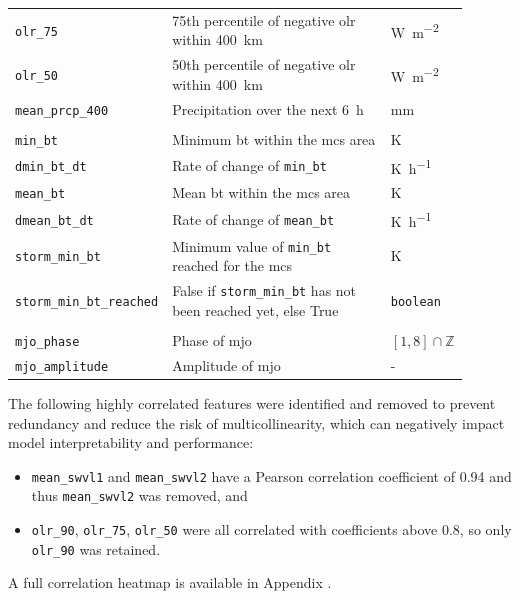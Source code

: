 {\begin{longtable}{>{\raggedright\arraybackslash}p{0.25\linewidth} p{0.50\linewidth} >{\raggedright\arraybackslash}p{0.15\linewidth}}
    \texttt{olr\_75} & 75th percentile of negative \acrshort{olr} within \SI{400}{\km} & \unit{\watt\per\square\meter} \\
    \texttt{olr\_50} & 50th percentile of negative \acrshort{olr} within \SI{400}{\km} & \unit{\watt\per\square\meter} \\
    \texttt{mean\_prcp\_400} & Precipitation over the next \SI{6}{\hour} & \unit{\milli\meter} \\
    \midrule
    \multicolumn{3}{c}{\textit{Storm intensity features}} \\
    \midrule
    \texttt{min\_bt} & Minimum \acrfull{bt} within the \acrshort{mcs} area & \unit{\kelvin} \\
    \texttt{dmin\_bt\_dt} & Rate of change of \texttt{min\_bt} & \unit{\kelvin\per\hour} \\
    \texttt{mean\_bt} & Mean \acrshort{bt} within the \acrshort{mcs} area & \unit{\kelvin} \\
    \texttt{dmean\_bt\_dt} & Rate of change of \texttt{mean\_bt} & \unit{\kelvin\per\hour} \\
    \texttt{storm\_min\_bt} & Minimum value of \texttt{min\_bt} reached for the \acrshort{mcs} & \unit{\kelvin} \\
    \texttt{storm\_min\_bt\_reached} & False if \texttt{storm\_min\_bt} has not been reached yet, else True & \texttt{boolean} \\
    \midrule
    \multicolumn{3}{c}{\textit{Other features}} \\
    \midrule
    \texttt{mjo\_phase} & Phase of \acrfull{mjo} & $[1, 8] \cap \mathbb{Z}$ \\
    \texttt{mjo\_amplitude} & Amplitude of \acrshort{mjo} & - \\
\end{longtable}
}

The following highly correlated features were identified and removed to prevent redundancy and reduce the risk of multicollinearity, which can negatively impact model interpretability and performance: 
\begin{itemize}
    \item \texttt{mean\_swvl1} and \texttt{mean\_swvl2} have a Pearson correlation coefficient of 0.94 and thus \texttt{mean\_swvl2} was removed, and
    \item \texttt{olr\_90}, \texttt{olr\_75}, \texttt{olr\_50} were all correlated with coefficients above 0.8, so only \texttt{olr\_90} was retained.
\end{itemize}
A full correlation heatmap is available in Appendix . 

